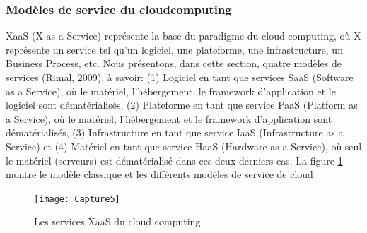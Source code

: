 \subsubsection {Modèles de service du cloudcomputing}  
XaaS (X as a Service) représente la base du paradigme du cloud computing, où X représente un service tel qu’un logiciel, une plateforme, une infrastructure, un Business Process, etc. Nous présentons, dans cette section,  quatre  modèles de services (Rimal, 2009), à savoir: (1) Logiciel en tant que services SaaS (Software as a Service), où le matériel, l’hébergement, le framework d’application et le logiciel sont dématérialisés, (2) Plateforme en tant que service PaaS (Platform as a Service), où le matériel, l’hébergement et le framework d’application sont dématérialisés, (3) Infrastructure en tant que service IaaS (Infrastructure as a Service) et (4) Matériel en tant que service HaaS (Hardware as a Service), où seul le matériel (serveurs) est dématérialisé dans ces deux derniers cas. La figure \ref{fig:capture5} montre le modèle classique et les différents modèles de service de cloud
\begin{figure}[h]
	\centering
	\texttt{[image: Capture5]}
	\caption{Les services XaaS du cloud computing}
	\label{fig:capture5}
\end{figure}

